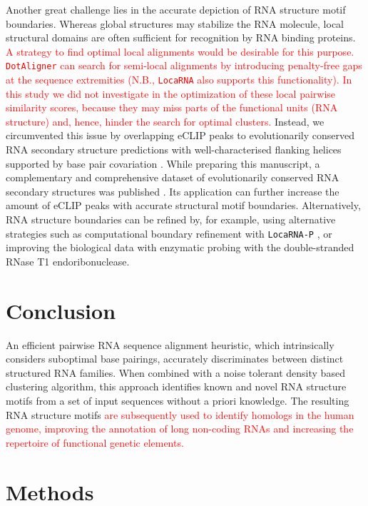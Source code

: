 \documentclass{bmcart}
\newcommand\dotaligner{\texttt{DotAligner}}
\newcommand\locarna{\texttt{LocaRNA}}
\begin{document}
Another great challenge lies in the accurate depiction of RNA structure motif boundaries. 
Whereas global structures may stabilize the RNA molecule, local
structural domains are often sufficient for recognition by RNA binding
proteins. \textcolor{red}{ A strategy to find optimal local alignments would be
desirable for this purpose. \dotaligner{} can search for semi-local alignments by introducing
penalty-free gaps at the sequence extremities (N.B., \locarna{} also supports
this functionality). In this study we did not investigate in the optimization
of these local pairwise similarity scores, because they may miss parts of the
functional units (RNA structure) and, hence, hinder the search for optimal
clusters.} Instead, we circumvented this issue by overlapping eCLIP peaks to
evolutionarily conserved RNA secondary structure predictions with
well-characterised flanking helices supported by base pair covariation
\cite{smith2013widespread}.  While preparing this manuscript, a complementary
and comprehensive dataset of evolutionarily conserved RNA secondary structures
was published \cite{seemann2017identification}. Its application can further
increase the amount of eCLIP peaks with accurate structural motif boundaries.
Alternatively, RNA structure boundaries can be refined by, for example, using
alternative strategies such as computational boundary refinement with 
\texttt{LocaRNA-P} \cite{will2012locarna}, or improving the biological data
with enzymatic probing with the double-stranded RNase T1 endoribonuclease. \\


\section*{Conclusion}
An efficient pairwise RNA sequence alignment heuristic, which intrinsically considers
suboptimal base pairings, accurately discriminates between distinct structured RNA families.
When combined with a noise tolerant density based clustering algorithm, this 
approach identifies known and novel RNA structure motifs from a set of input sequences 
without a priori knowledge. The resulting RNA structure motifs \textcolor{red}{are subsequently 
used to identify homologs in the human genome, improving the annotation of 
long non-coding RNAs and increasing the repertoire of functional genetic elements. }

\section*{Methods} 
\end{document}
